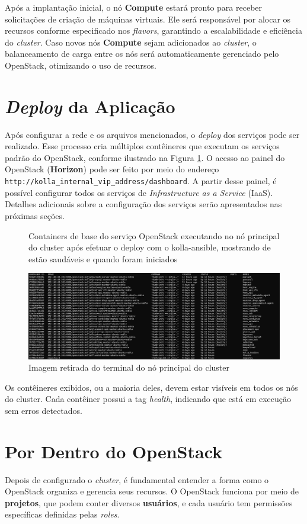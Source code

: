 Após a implantação inicial, o nó \textbf{Compute} estará pronto para receber solicitações de criação de máquinas virtuais. Ele será responsável por alocar os recursos conforme especificado nos \textit{flavors}, garantindo a escalabilidade e eficiência do \textit{cluster}. Caso novos nós \textbf{Compute} sejam adicionados ao \textit{cluster}, o balanceamento de carga entre os nós será automaticamente gerenciado pelo OpenStack, otimizando o uso de recursos.


\section{\textit{Deploy} da Aplicação}
Após configurar a rede e os arquivos mencionados, o \textit{deploy} dos serviços pode ser realizado. Esse processo cria múltiplos contêineres que executam os serviços padrão do OpenStack, conforme ilustrado na Figura \ref{fig:controller_containers}. O acesso ao painel do OpenStack (\textbf{Horizon}) pode ser feito por meio do endereço \texttt{http://kolla\_internal\_vip\_address/dashboard}. A partir desse painel, é possível configurar todos os serviços de \textit{Infrastructure as a Service} (IaaS). Detalhes adicionais sobre a configuração dos serviços serão apresentados nas próximas seções.


\begin{figure}[htbp]
    \centering
    \caption{Containers de base do serviço OpenStack executando no nó principal do cluster após efetuar o deploy com o kolla-ansible, mostrando de estão saudáveis e quando foram iniciados}
    \includegraphics[width=1.0\textwidth]{images/controller_containers.png}
    \caption{Imagem retirada do terminal do nó principal do cluster}
    \label{fig:controller_containers}
\end{figure}

Os contêineres exibidos, ou a maioria deles, devem estar visíveis em todos os nós do cluster. Cada contêiner possui a tag \textit{health}, indicando que está em execução sem erros detectados.

\section{Por Dentro do OpenStack}
Depois de configurado o \textit{cluster}, é fundamental entender a forma como o OpenStack organiza e gerencia seus recursos. O OpenStack funciona por meio de \textbf{projetos}, que podem conter diversos \textbf{usuários}, e cada usuário tem permissões específicas definidas pelas \textit{roles}. 

